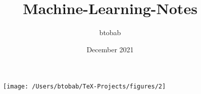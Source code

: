 \documentclass{report}
\title{Machine-Learning-Notes}
\author{btobab}
\date{December 2021}
\begin{document}
\begin{figure}
\center
\texttt{[image: /Users/btobab/TeX-Projects/figures/2]}
\end{figure}
\maketitle
{}
\tableofcontents
\newpage
{}












\end{document}
